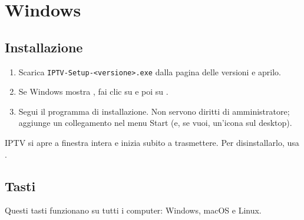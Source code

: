 
\section{Windows}
\label{sec:windows}

\subsection{Installazione}
\begin{enumerate}
  \item Scarica \texttt{IPTV-Setup-\textless versione\textgreater.exe} dalla
        pagina delle versioni e aprilo.
  \item Se Windows mostra , fai clic su
         e poi su .
  \item Segui il programma di installazione. Non servono diritti di
        amministratore; aggiunge un collegamento nel menu Start (e, se vuoi,
        un'icona sul desktop).
\end{enumerate}
IPTV si apre a finestra intera e inizia subito a trasmettere. Per
disinstallarlo, usa .

\subsection{Tasti}
\label{sec:keys}
Questi tasti funzionano su tutti i computer: Windows, macOS e Linux.

